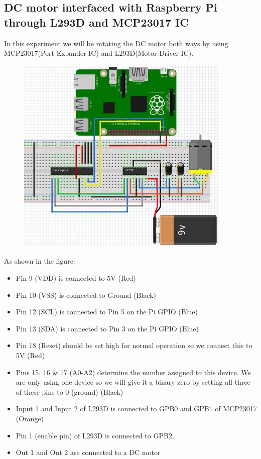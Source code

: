 \documentclass[11pt,a4paper]{article}
\begin{document}
	\newpage
	
	
	\subsection{ DC motor interfaced with Raspberry Pi through L293D and MCP23017 IC}
	In this experiment we will be rotating the DC motor both ways by using MCP23017(Port Expander IC) and L293D(Motor Driver IC).
	  
	\begin{figure}[h!]
		\includegraphics[scale=0.6]{DC_motor_I2C.jpg}
		\centering
	\end{figure} 
	As shown in the figure:
	\begin{itemize}
		\item Pin 9 (VDD) is connected to 5V (Red)
		\item Pin 10 (VSS) is connected to Ground (Black)
		\item Pin 12 (SCL) is connected to Pin 5 on the Pi GPIO (Blue)
		\item Pin 13 (SDA) is connected to Pin 3 on the Pi GPIO (Blue)
		\item Pin 18 (Reset) should be set high for normal operation so we connect this to 5V (Red)
		\item Pins 15, 16 \& 17 (A0-A2) determine the number assigned to this device. We are only using one device so we will give it a binary zero by setting all three of these pins to 0 (ground) (Black)
		\item Input 1 and Input 2 of L293D is connected to GPB0 and GPB1 of MCP23017 (Orange)
		\item Pin 1 (enable pin) of L293D is connected to GPB2.
		\item Out 1 and Out 2 are connected to a DC motor
	\end{itemize}
	
\end{document}
